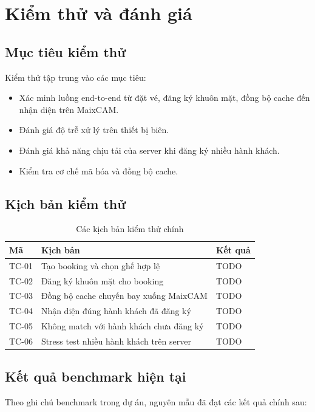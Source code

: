 \section{Kiểm thử và đánh giá}

\subsection{Mục tiêu kiểm thử}
Kiểm thử tập trung vào các mục tiêu:

\begin{itemize}
  \item Xác minh luồng end-to-end từ đặt vé, đăng ký khuôn mặt, đồng bộ cache đến nhận diện trên MaixCAM.
  \item Đánh giá độ trễ xử lý trên thiết bị biên.
  \item Đánh giá khả năng chịu tải của server khi đăng ký nhiều hành khách.
  \item Kiểm tra cơ chế mã hóa và đồng bộ cache.
\end{itemize}

\subsection{Kịch bản kiểm thử}
\begin{table}[H]
  \centering
  \caption{Các kịch bản kiểm thử chính}
  \begin{tabularx}{\textwidth}{lXl}
    \toprule
    \textbf{Mã} & \textbf{Kịch bản} & \textbf{Kết quả} \\
    \midrule
    TC-01 & Tạo booking và chọn ghế hợp lệ & TODO \\
    TC-02 & Đăng ký khuôn mặt cho booking & TODO \\
    TC-03 & Đồng bộ cache chuyến bay xuống MaixCAM & TODO \\
    TC-04 & Nhận diện đúng hành khách đã đăng ký & TODO \\
    TC-05 & Không match với hành khách chưa đăng ký & TODO \\
    TC-06 & Stress test nhiều hành khách trên server & TODO \\
    \bottomrule
  \end{tabularx}
\end{table}

\subsection{Kết quả benchmark hiện tại}
Theo ghi chú benchmark trong dự án, nguyên mẫu đã đạt các kết quả chính sau:

